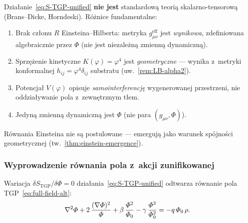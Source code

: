\begin{remark}%
\label{rem:not-scalar-tensor}
Dzia\l{}anie~\eqref{eq:S-TGP-unified} \textbf{nie jest}
standardow\k{a} teori\k{a} skalarno-tensorow\k{a} (Brans--Dicke,
Horndeski). R\'o\.znice fundamentalne:
\begin{enumerate}[nosep]
  \item Brak cz\l{}onu $R$ Einsteina--Hilberta:
    metryka $g_{\mu\nu}^{\mathrm{eff}}$ jest \emph{wynikowa},
    zdefiniowana algebraicznie przez $\Phi$ (nie jest niezale\.zn\k{a}
    zmienn\k{a} dynamiczn\k{a}).
  \item Sprz\k{e}\.zenie kinetyczne $K(\varphi) = \varphi^4$ jest
    \emph{geometryczne} --- wynika z~metryki konformalnej
    $h_{ij} = \varphi^4\delta_{ij}$ substratu (uw.~\ref{rem:LB-alpha2}).
  \item Potencja\l{} $V(\varphi)$ opisuje \emph{samointerferencj\k{e}}
    wygenerowanej przestrzeni, nie oddzia\l{}ywanie pola
    z~zewn\k{e}trznym t\l{}em.
  \item Jedyn\k{a} zmienn\k{a} dynamiczn\k{a} jest $\Phi$
    (nie para $(g_{\mu\nu},\Phi)$).
\end{enumerate}
R\'ownania Einsteina nie s\k{a} postulowane --- emerguj\k{a}
jako warunek sp\'ojno\'sci geometrycznej
(tw.~\ref{thm:einstein-emergence}).
\end{remark}

\subsubsection{Wyprowadzenie r\'ownania pola z~akcji zunifikowanej}%
\label{sssec:variation-unified}

\begin{proposition}%
\label{prop:field-eq-from-action}

Wariacja $\delta S_{\mathrm{TGP}}/\delta\Phi = 0$
dzia\l{}ania~\eqref{eq:S-TGP-unified} odtwarza r\'ownanie
pola TGP~\eqref{eq:full-field-alt}:
\begin{equation}\label{eq:field-eq-reproduced}
  \nabla^2\varPhi + 2\,\frac{(\nabla\varPhi)^2}{\varPhi}
  + \beta\,\frac{\varPhi^2}{\varPhi_0}
  - \gamma\,\frac{\varPhi^3}{\varPhi_0^2}
  = -q\,\varPhi_0\,\rho.
\end{equation}
\end{proposition}

